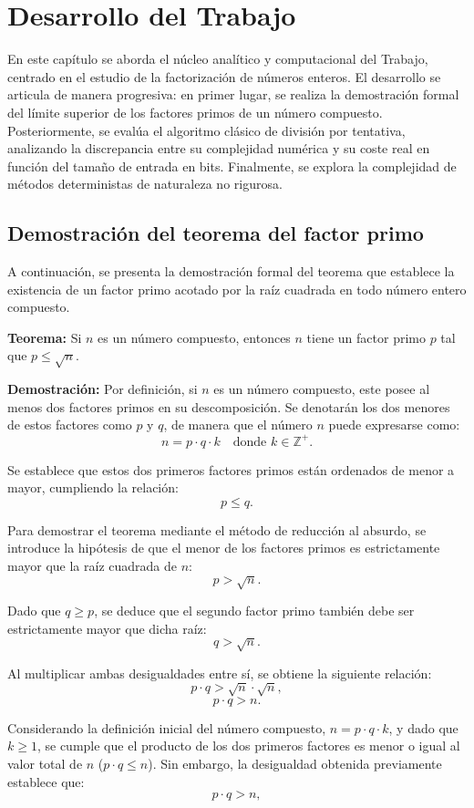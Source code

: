 \documentclass[11pt,a4paper,spanish]{book}
\begin{document}
\chapter{Desarrollo del Trabajo}

En este capítulo se aborda el núcleo analítico y computacional del Trabajo, centrado en el estudio de la factorización de números enteros. El desarrollo se articula de manera progresiva: en primer lugar, se realiza la demostración formal del límite superior de los factores primos de un número compuesto. Posteriormente, se evalúa el algoritmo clásico de división por tentativa, analizando la discrepancia entre su complejidad numérica y su coste real en función del tamaño de entrada en bits. Finalmente, se explora la complejidad de métodos deterministas de naturaleza no rigurosa.

\section{Demostración del teorema del factor primo}

A continuación, se presenta la demostración formal del teorema que establece la existencia de un factor primo acotado por la raíz cuadrada en todo número entero compuesto.

\textbf{Teorema:} Si $n$ es un número compuesto, entonces $n$ tiene un factor primo $p$ tal que $p \leq \sqrt{n}$.

\textbf{Demostración:} 
Por definición, si $n$ es un número compuesto, este posee al menos dos factores primos en su descomposición. Se denotarán los dos menores de estos factores como $p$ y $q$, de manera que el número $n$ puede expresarse como:
$$n = p \cdot q \cdot k \quad \text{donde } k \in \mathbb{Z}^+.$$

Se establece que estos dos primeros factores primos están ordenados de menor a mayor, cumpliendo la relación:
$$p \leq q.$$

Para demostrar el teorema mediante el método de reducción al absurdo, se introduce la hipótesis de que el menor de los factores primos es estrictamente mayor que la raíz cuadrada de $n$:
$$p > \sqrt{n}.$$

Dado que $q \geq p$, se deduce que el segundo factor primo también debe ser estrictamente mayor que dicha raíz:
$$q > \sqrt{n}.$$

Al multiplicar ambas desigualdades entre sí, se obtiene la siguiente relación:
$$p \cdot q > \sqrt{n} \cdot \sqrt{n},$$
$$p \cdot q > n.$$

Considerando la definición inicial del número compuesto, $n = p \cdot q \cdot k$, y dado que $k \geq 1$, se cumple que el producto de los dos primeros factores es menor o igual al valor total de $n$ ($p \cdot q \leq n$). Sin embargo, la desigualdad obtenida previamente establece que:
$$p \cdot q > n,$$
\end{document}
